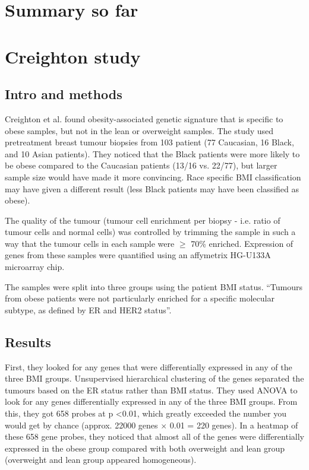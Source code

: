 \documentclass[a4paper, 11pt]{article}
\begin{document}
\section*{Summary so far}

\section*{Creighton study}

\subsection*{Intro and methods}

Creighton et al. found obesity-associated genetic signature that is specific to obese samples, but not in the lean or overweight samples.
The study used pretreatment breast tumour biopsies from 103 patient (77 Caucasian, 16 Black, and 10 Asian patients).
They noticed that the Black patients were more likely to be obese compared to the Caucasian patients (13/16 vs. 22/77), but larger sample size would have made it more convincing.
Race specific BMI classification may have given a different result (less Black patients may have been classified as obese).

The quality of the tumour (tumour cell enrichment per biopsy - i.e. ratio of tumour cells and normal cells) was controlled by trimming the sample in such a way that the tumour cells in each sample were $\geq$ 70\% enriched.
Expression of genes from these samples were quantified using an affymetrix HG-U133A microarray chip.

The samples were split into three groups using the patient BMI status.
``Tumours from obese patients were not particularly enriched for a specific molecular subtype, as defined by ER and HER2 status''.

\subsection*{Results}

First, they looked for any genes that were differentially expressed in any of the three BMI groups.
Unsupervised hierarchical clustering of the genes separated the tumours based on the ER status rather than BMI status.
They used ANOVA to look for any genes differentially expressed in any of the three BMI groups.
From this, they got 658 probes at p \textless 0.01, which greatly exceeded the number you would get by chance (approx. 22000 genes $\times$ 0.01 = 220 genes).
In a heatmap of these 658 gene probes, they noticed that almost all of the genes were differentially expressed in the obese group compared with both overweight and lean group (overweight and lean group appeared homogeneous).
\end{document}
